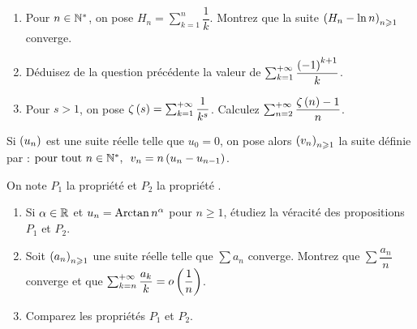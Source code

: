 \begin{corr}
\end{corr}

\begin{exo}~\\
\begin{enumerate}
    \item Pour \(n\in\mathbb{N}^*\), on pose \(H_n=\sum_{k=1}^n\dfrac{1}{k}\). Montrez que la suite \(\left(H_n-\ln n\right)_{n\geqslant1}\) converge. \\
    \item Déduisez de la question précédente la valeur de \(\sum_{k=1}^{+\infty}\dfrac{\left(-1\right)^{k+1}}{k}\). \\
    \item Pour \(s>1\), on pose \(\zeta\left(s\right)=\sum_{k=1}^{+\infty}\dfrac{1}{k^s}\). Calculez \(\sum_{n=2}^{+\infty}\dfrac{\zeta\left(n\right)-1}{n}\).
\end{enumerate}
\end{exo}

\begin{corr}
\end{corr}

\begin{exo}
Si \(\left(u_n\right)\) est une suite réelle telle que \(u_0=0\), on pose alors \(\left(v_n\right)_{n\geqslant1}\) la suite définie par : \(\quantifs{\tpt n\in\Ns}v_n=n\paren{u_n-u_{n-1}}\).

On note \(P_1\) la propriété  et \(P_2\) la propriété .

\begin{enumerate}
    \item Si \(\alpha\in\mathbb{R}\) et \(u_n=\operatorname{Arctan} n^\alpha\) pour \(n\geq1\), étudiez la véracité des propositions \(P_1\) et \(P_2\). \\
    \item Soit \(\left(a_n\right)_{n\geqslant1}\) une suite réelle telle que \(\sum a_n\) converge. Montrez que \(\sum\dfrac{a_n}{n}\) converge et que \(\sum_{k=n}^{+\infty}\dfrac{a_k}{k}=o\left(\dfrac{1}{n}\right)\). \\
    \item Comparez les propriétés \(P_1\) et \(P_2\).
\end{enumerate}
\end{exo}

\begin{corr}
\end{corr}

